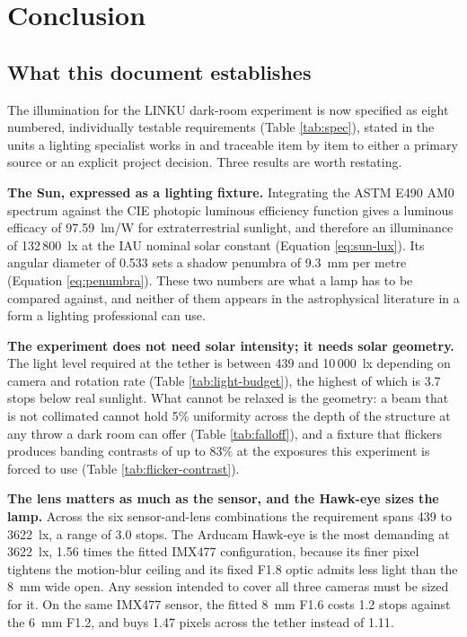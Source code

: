 \chapter{Conclusion}

\section{What this document establishes}

The illumination for the LINKU dark-room experiment is now specified as eight numbered, individually testable requirements (Table \ref{tab:spec}), stated in the units a lighting specialist works in and traceable item by item to either a primary source or an explicit project decision. Three results are worth restating.

\textbf{The Sun, expressed as a lighting fixture.} Integrating the ASTM E490 AM0 spectrum against the CIE photopic luminous efficiency function gives a luminous efficacy of 97.59~lm/W for extraterrestrial sunlight, and therefore an illuminance of 132\,800~lx at the IAU nominal solar constant (Equation \ref{eq:sun-lux}). Its angular diameter of 0.533\textdegree{} sets a shadow penumbra of 9.3~mm per metre (Equation \ref{eq:penumbra}). These two numbers are what a lamp has to be compared against, and neither of them appears in the astrophysical literature in a form a lighting professional can use.

\textbf{The experiment does not need solar intensity; it needs solar geometry.} The light level required at the tether is between 439 and 10\,000~lx depending on camera and rotation rate (Table \ref{tab:light-budget}), the highest of which is 3.7 stops below real sunlight. What cannot be relaxed is the geometry: a beam that is not collimated cannot hold 5\% uniformity across the depth of the structure at any throw a dark room can offer (Table \ref{tab:falloff}), and a fixture that flickers produces banding contrasts of up to 83\% at the exposures this experiment is forced to use (Table \ref{tab:flicker-contrast}).

\textbf{The lens matters as much as the sensor, and the Hawk-eye sizes the lamp.} Across the six sensor-and-lens combinations the requirement spans 439 to 3622~lx, a range of 3.0 stops. The Arducam Hawk-eye is the most demanding at 3622~lx, 1.56 times the fitted IMX477 configuration, because its finer pixel tightens the motion-blur ceiling and its fixed F1.8 optic admits less light than the 8~mm wide open. Any session intended to cover all three cameras must be sized for it. On the same IMX477 sensor, the fitted 8~mm F1.6 costs 1.2 stops against the 6~mm F1.2, and buys 1.47 pixels across the tether instead of 1.11.

